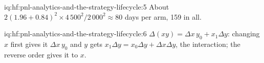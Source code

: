 \begin{solution}{iq:hf:pnl-analytics-and-the-strategy-lifecycle:5}
About $2(1.96+0.84)^2\times4\,500^2/2\,000^2\approx80$ days per arm, 159 in all.
\end{solution}

\begin{solution}{iq:hf:pnl-analytics-and-the-strategy-lifecycle:6}
$\Delta(xy)=\Delta x\,y_0+x_1\Delta y$: changing $x$ first gives it $\Delta x\,y_0$ and $y$ gets $x_1\Delta y=x_0\Delta y+\Delta x\Delta y$, the
interaction; the reverse order gives it to $x$.
\end{solution}
